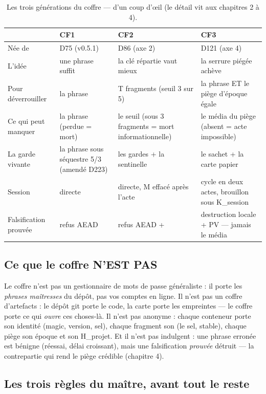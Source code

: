 \begin{table}[htbp]
\centering\small
\caption{Les trois générations du coffre — d'un coup d'œil (le détail vit aux
chapitres 2 à 4).}
\label{tab:generations}
\begin{tabularx}{\textwidth}{@{}l Y Y Y@{}}
\toprule
 & \textbf{CF1} & \textbf{CF2} & \textbf{CF3} \\
\midrule
Née de & D75 (v0.5.1) & D86 (axe 2) & D121 (axe 4) \\
L'idée & une phrase suffit & la clé répartie vaut mieux & la serrure piégée
achève \\
Pour déverrouiller & la phrase & T fragments (seuil 3 sur 5) & la phrase ET le
piège d'époque égale \\
Ce qui peut manquer & la phrase (perdue = mort) & le seuil (sous 3 fragments =
mort informationnelle) & le média du piège (absent = acte impossible) \\
La garde vivante & la phrase sous séquestre 5/3 (amendé D223) & les gardes + la sentinelle & le sachet
+ la carte papier \\
Session & directe & directe, M effacé après l'acte & cycle en deux actes, brouillon
sous K\_session \\
Falsification prouvée & refus AEAD & refus AEAD +  & destruction locale
+ PV — jamais le média \\
\bottomrule
\end{tabularx}
\end{table}

\subsection{Ce que le coffre N'EST PAS}\label{sec:pas}

Le coffre n'est pas un gestionnaire de mots de passe généraliste : il porte les
\emph{phrases maîtresses} du dépôt, pas vos comptes en ligne. Il n'est pas un coffre
d'artefacts : le dépôt git porte le code, la carte porte les empreintes — le coffre
porte ce qui \emph{ouvre} ces choses-là. Il n'est pas anonyme : chaque conteneur porte
son identité (magic, version, sel), chaque fragment son  (le sel, stable),
chaque piège son époque et son H\_projet. Et il n'est pas indulgent : une phrase
erronée est bénigne (réessai, délai croissant), mais une falsification \emph{prouvée}
détruit — la contrepartie qui rend le piège crédible (chapitre 4).

\subsection{Les trois règles du maître, avant tout le reste}\label{sec:troisregles}

